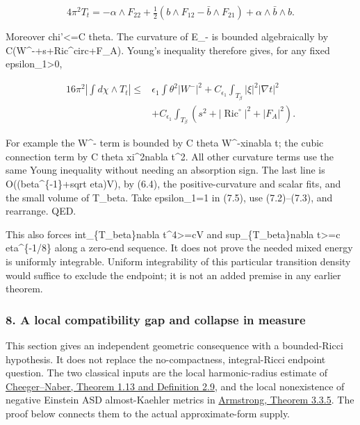 \documentclass[
  10pt,
]{article}
\begin{document}
\[
 4\pi^2T_t=-\alpha\wedge F_{22}
   +\tfrac12(b\wedge F_{12}-\bar b\wedge F_{21})
   +\alpha\wedge\bar b\wedge b.
\]

Moreover \textbar chi'\textbar\textless=C theta. The curvature of E\_-
is bounded algebraically by
C(\textbar W\^{}-\textbar+\textbar s\textbar+\textbar Ric\^{}circ\textbar+\textbar F\_A\textbar).
Young's inequality therefore gives, for any fixed
epsilon\_1\textgreater0,

\[
\begin{aligned}
16\pi^2\left|\int d\chi\wedge T_t\right|
 \le{}&\epsilon_1\int\theta^2|W^-|^2
       +C_{\epsilon_1}\int_{T_\beta}|\xi|^2|\nabla t|^2\\
      &+C_{\epsilon_1}\int_{T_\beta}
              (s^2+|\operatorname{Ric}^{\circ}|^2+|F_A|^2).
\end{aligned}                                                     \tag{7.5}
\]

For example the W\^{}- term is bounded by C theta
\textbar W\^{}-\textbar\textbar xi\textbar\textbar nabla t\textbar; the
cubic connection term by C theta \textbar xi\textbar\^{}2\textbar nabla
t\textbar\^{}2. All other curvature terms use the same Young inequality
without needing an absorption sign. The last line is
O((beta\^{}\{-1\}+sqrt eta)V), by (6.4), the positive-curvature and
scalar fits, and the small volume of T\_beta. Take epsilon\_1=1 in
(7.5), use (7.2)--(7.3), and rearrange. QED.

This also forces int\_\{T\_beta\}\textbar nabla
t\textbar\^{}4\textgreater=cV and sup\_\{T\_beta\}\textbar nabla
t\textbar\textgreater=c eta\^{}\{-1/8\} along a zero-end sequence. It
does not prove the needed mixed energy is uniformly integrable. Uniform
integrability of this particular transition density would suffice to
exclude the endpoint; it is not an added premise in any earlier theorem.

\hypertarget{a-local-compatibility-gap-and-collapse-in-measure}{%
\subsubsection{8. A local compatibility gap and collapse in
measure}\label{a-local-compatibility-gap-and-collapse-in-measure}}

This section gives an independent geometric consequence with a
bounded-Ricci hypothesis. It does not replace the no-compactness,
integral-Ricci endpoint question. The two classical inputs are the local
harmonic-radius estimate of
\href{https://arxiv.org/pdf/1406.6534}{Cheeger--Naber, Theorem 1.13 and
Definition 2.9}, and the local nonexistence of negative Einstein ASD
almost-Kaehler metrics in
\href{https://johnarmstrongmaths.com/publications/resources/thesis.pdf}{Armstrong,
Theorem 3.3.5}. The proof below connects them to the actual
approximate-form supply.
\end{document}

